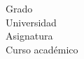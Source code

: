 \begin{titlepage}
  \centering
  \Large


  \vfill


  \vfill

  Grado\\
  Universidad\\
  Asignatura\\
  Curso académico
\end{titlepage}
